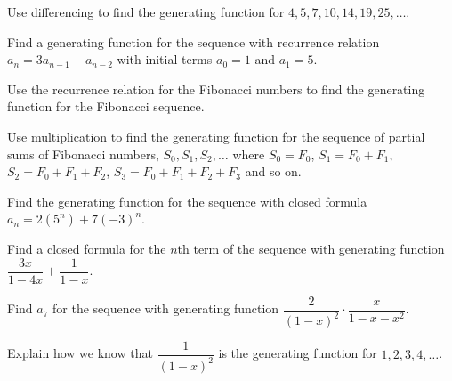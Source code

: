 \documentclass[10pt,]{book}
\theoremstyle{plain}
\theoremstyle{definition}
\theoremstyle{definition}
\theoremstyle{definition}
\theoremstyle{definition}
\numberwithin{equation}{chapter}
\begin{document}
\begin{divisionexercise}{4}\hypertarget{exercise-87}{}
\hypertarget{p-1024}{}%
Use differencing to find the generating function for \(4, 5, 7, 10, 14, 19, 25, \ldots\).%
\end{divisionexercise}%
\begin{divisionexercise}{5}\hypertarget{exercise-88}{}
\hypertarget{p-1026}{}%
Find a generating function for the sequence with recurrence relation \(a_n = 3a_{n-1} - a_{n-2}\) with initial terms \(a_0 = 1\) and \(a_1 = 5\).%
\end{divisionexercise}%
\begin{divisionexercise}{6}\hypertarget{exercise-89}{}
\hypertarget{p-1028}{}%
Use the recurrence relation for the Fibonacci numbers to find the generating function for the Fibonacci sequence.%
\end{divisionexercise}%
\begin{divisionexercise}{7}\hypertarget{exercise-90}{}
\hypertarget{p-1030}{}%
Use multiplication to find the generating function for the sequence of partial sums of Fibonacci numbers, \(S_0, S_1, S_2, \ldots\) where \(S_0 = F_0\), \(S_1 = F_0 + F_1\), \(S_2 = F_0 + F_1 + F_2\), \(S_3 = F_0 + F_1 + F_2 + F_3\) and so on.%
\end{divisionexercise}%
\begin{divisionexercise}{8}\hypertarget{exercise-91}{}
\hypertarget{p-1032}{}%
Find the generating function for the sequence with closed formula \(a_n = 2(5^n) + 7(-3)^n\).%
\end{divisionexercise}%
\begin{divisionexercise}{9}\hypertarget{exercise-92}{}
\hypertarget{p-1034}{}%
Find a closed formula for the \(n\)th term of the sequence with generating function \(\dfrac{3x}{1-4x} + \dfrac{1}{1-x}\).%
\end{divisionexercise}%
\begin{divisionexercise}{10}\hypertarget{exercise-93}{}
\hypertarget{p-1036}{}%
Find \(a_7\) for the sequence with generating function \(\dfrac{2}{(1-x)^2}\cdot\dfrac{x}{1-x-x^2}\).%
\end{divisionexercise}%
\begin{divisionexercise}{11}\hypertarget{exercise-94}{}
\hypertarget{p-1038}{}%
Explain how we know that \(\dfrac{1}{(1-x)^2}\) is the generating function for \(1, 2, 3, 4, \ldots\).%
\end{divisionexercise}%
\end{document}
